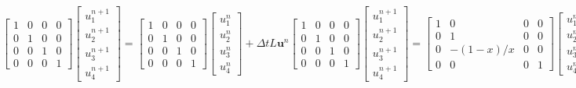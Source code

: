 \begin{subequations}
\begin{equation}\label{eq:C3_euelrMethodBefore}
    \begin{bmatrix}
    1 & 0 & 0 & 0 \\
    0 & 1 & 0 & 0 \\
    0 & 0 & 1 & 0 \\
    0 & 0 & 0 & 1
    \end{bmatrix}
    \begin{bmatrix}
    u_1^{n+1} \\
    u_2^{n+1} \\
    u_3^{n+1} \\
    u_4^{n+1}
    \end{bmatrix}
    =
    \begin{bmatrix}
    1 & 0 & 0 & 0 \\
    0 & 1 & 0 & 0 \\
    0 & 0 & 1 & 0 \\
    0 & 0 & 0 & 1
    \end{bmatrix}
    \begin{bmatrix}
    u_1^{n} \\
    u_2^{n} \\
    u_3^{n} \\
    u_4^{n}
    \end{bmatrix}
    + 
    \Delta t L \mathbf{u}^n
\end{equation}
\begin{equation}\label{eq:C3_euelrMethodAfter}
    \begin{bmatrix}
    1 & 0 & 0 & 0 \\
    0 & 1 & 0 & 0 \\
    0 & 0 & 1 & 0 \\
    0 & 0 & 0 & 1
    \end{bmatrix}
    \begin{bmatrix}
    u_1^{n+1} \\
    u_2^{n+1} \\
    u_3^{n+1} \\
    u_4^{n+1}
    \end{bmatrix}
    =
    \begin{bmatrix}
    1 & 0 & 0 & 0 \\
    0 & 1 & 0 & 0 \\
    0 & -(1-x)/x & 0 & 0 \\
    0 & 0 & 0 & 1
    \end{bmatrix}
    \begin{bmatrix}
    u_1^{n} \\
    u_2^{n} \\
    u_3^{n} \\
    u_4^{n}
    \end{bmatrix}
    + 
    \Delta t L' \mathbf{u}^n
\end{equation}
\end{subequations}

